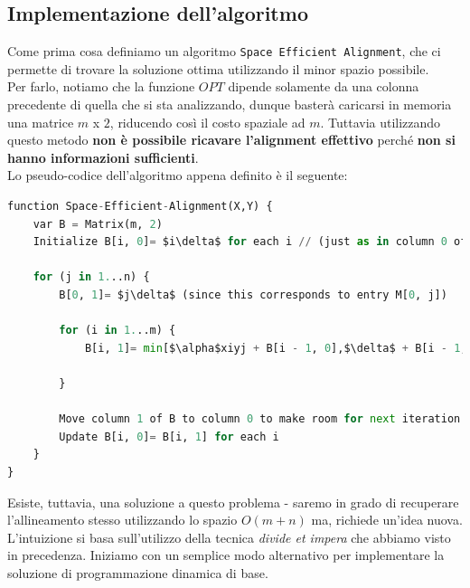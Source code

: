\subsection{Implementazione dell'algoritmo}

Come prima cosa definiamo un algoritmo
\texttt{Space\ Efficient\ Alignment}, che ci permette di trovare la
soluzione ottima utilizzando il minor spazio possibile.\\ Per farlo,
notiamo che la funzione $OPT$ dipende solamente da una colonna
precedente di quella che si sta analizzando, dunque basterà caricarsi in
memoria una matrice $m$ x $2$, riducendo così il costo spaziale ad
$m$. Tuttavia utilizzando questo metodo \textbf{non è possibile
	ricavare l'alignment effettivo} perché \textbf{non si hanno informazioni
	sufficienti}.\\

Lo pseudo-codice dell'algoritmo appena definito è il seguente:

\begin{lstlisting}[language=Python, mathescape=true]
function Space-Efficient-Alignment(X,Y) {
    var B = Matrix(m, 2)
    Initialize B[i, 0]= $i\delta$ for each i // (just as in column 0 of M)
    
    for (j in 1...n) {
        B[0, 1]= $j\delta$ (since this corresponds to entry M[0, j])
        
        for (i in 1...m) {
            B[i, 1]= min[$\alpha$xiyj + B[i - 1, 0],$\delta$ + B[i - 1, 1], $\delta$ + B[i, 0]]

        }
        
        Move column 1 of B to column 0 to make room for next iteration:
        Update B[i, 0]= B[i, 1] for each i
    }
}
\end{lstlisting}

Esiste, tuttavia, una soluzione a questo problema - saremo in grado di
recuperare l'allineamento stesso utilizzando lo spazio $O(m + n)$ ma,
richiede un'idea nuova. L'intuizione si basa sull'utilizzo della tecnica
\emph{divide et impera} che abbiamo visto in precedenza. Iniziamo con un
semplice modo alternativo per implementare la soluzione di
programmazione dinamica di base.\\

